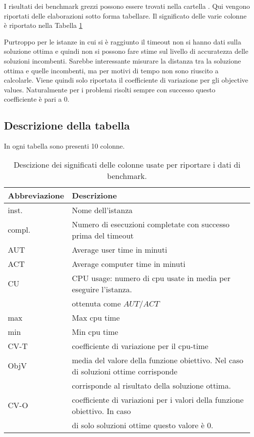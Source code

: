 I risultati dei benchmark grezzi possono essere trovati nella cartella 
. Qui vengono riportati delle elaborazioni sotto forma tabellare.
Il significato delle varie colonne è riportato nella Tabella \ref{table:description}

Purtroppo per le istanze in cui si è raggiunto il timeout non si hanno dati
sulla soluzione ottima e quindi non si possono 
fare stime sul livello di accuratezza delle soluzioni incombenti. Sarebbe
interessante misurare la distanza tra la soluzione ottima
e quelle incombenti, ma per motivi di tempo non sono riuscito a calcolarle.
Viene quindi solo riportata il coefficiente di variazione per gli
objective values. Naturalmente 
per i problemi risolti sempre con successo questo coefficiente è pari a $0$.

\subsection{Descrizione della tabella}
In ogni tabella sono presenti 10 colonne.
\begin{table}
\centering
\small
\begin{tabular}{| l| l |}
\hline
Abbreviazione & Descrizione \\
\hline
inst. & Nome dell'istanza \\
compl. & Numero di esecuzioni completate con successo prima del timeout\\
AUT & Average user time in minuti \\
ACT & Average computer time in minuti\\
CU  & CPU usage: numero di cpu usate in media per eseguire l'istanza. \\
	& ottenuta come $AUT/ACT$\\
max & Max cpu time \\
min & Min cpu time \\
CV-T & coefficiente di variazione per il cpu-time \\
ObjV & media del valore della funzione obiettivo. Nel caso di soluzioni ottime corrisponde\\
	& corrisponde al risultato della soluzione ottima.\\
CV-O & coefficiente di variazioni per i valori della funzione obiettivo. In caso \\
& di solo soluzioni ottime questo valore è $0$. \\
\hline
\end{tabular}
\caption{Descizione dei significati delle colonne usate per riportare i dati
di benchmark.}
\label{table:description}
\end{table}

